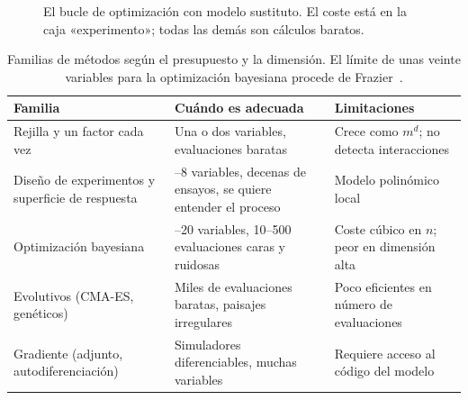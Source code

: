 \begin{figure}[ht]
\centering
{}
\caption{El bucle de optimización con modelo sustituto. El coste está en la caja «experimento»; todas las demás son cálculos baratos.}
\label{fig:bucle}
\end{figure}

\begin{table}[ht]
\centering\small
\begin{tabularx}{\textwidth}{@{}>{\raggedright\arraybackslash}p{2.9cm}>{\raggedright\arraybackslash}X>{\raggedright\arraybackslash}p{3.6cm}@{}}
\toprule
Familia & Cuándo es adecuada & Limitaciones \\
\midrule
Rejilla y un factor cada vez & Una o dos variables, evaluaciones baratas & Crece como $m^{d}$; no detecta interacciones \\
Diseño de experimentos y superficie de respuesta & 2–8 variables, decenas de ensayos, se quiere entender el proceso & Modelo polinómico local \\
Optimización bayesiana & 1–20 variables, 10–500 evaluaciones caras y ruidosas & Coste cúbico en $n$; peor en dimensión alta \\
Evolutivos (CMA-ES, genéticos) & Miles de evaluaciones baratas, paisajes irregulares & Poco eficientes en número de evaluaciones \\
Gradiente (adjunto, autodiferenciación) & Simuladores diferenciables, muchas variables & Requiere acceso al código del modelo \\
\bottomrule
\end{tabularx}
\caption{Familias de métodos según el presupuesto y la dimensión. El límite de unas veinte variables para la optimización bayesiana procede de Frazier~\cite[§1]{frazier}.}
\label{tab:familias}
\end{table}

